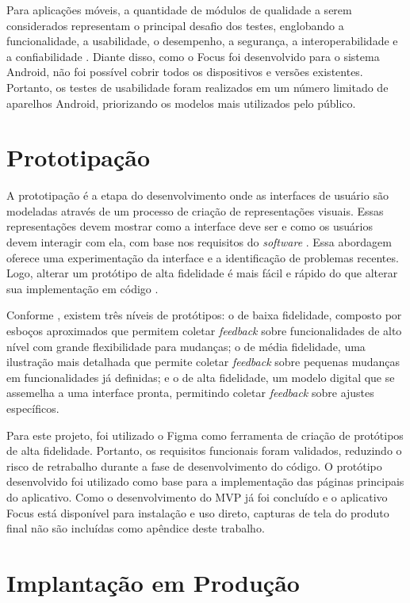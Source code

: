 Para aplicações móveis, a quantidade de módulos de qualidade a serem considerados representam o principal desafio dos testes, englobando a funcionalidade, a usabilidade, o desempenho, a segurança, a interoperabilidade e a confiabilidade \cite{goericke_2020}.
Diante disso, como o Focus foi desenvolvido para o sistema Android, não foi possível cobrir todos os dispositivos e versões existentes.
Portanto, os testes de usabilidade foram realizados em um número limitado de aparelhos Android, priorizando os modelos mais utilizados pelo público.

\section{Prototipação}

A prototipação é a etapa do desenvolvimento onde as interfaces de usuário são modeladas através de um processo de criação de representações visuais.
Essas representações devem mostrar como a interface deve ser e como os usuários devem interagir com ela, com base nos requisitos do \textit{software} \cite{letaw_2024}.
Essa abordagem oferece uma experimentação da interface e a identificação de problemas recentes.
Logo, alterar um protótipo de alta fidelidade é mais fácil e rápido do que alterar sua implementação em código \cite{letaw_2024}.

Conforme , existem três níveis de protótipos: o de baixa fidelidade, composto por esboços aproximados que permitem coletar \textit{feedback} sobre funcionalidades de alto nível com grande flexibilidade para mudanças; o de média fidelidade, uma ilustração mais detalhada que permite coletar \textit{feedback} sobre pequenas mudanças em funcionalidades já definidas; e o de alta fidelidade, um modelo digital que se assemelha a uma interface pronta, permitindo coletar \textit{feedback} sobre ajustes específicos.

Para este projeto, foi utilizado o Figma como ferramenta de criação de protótipos de alta fidelidade.
Portanto, os requisitos funcionais foram validados, reduzindo o risco de retrabalho durante a fase de desenvolvimento do código.
O protótipo desenvolvido foi utilizado como base para a implementação das páginas principais do aplicativo.
Como o desenvolvimento do MVP já foi concluído e o aplicativo Focus está disponível para instalação e uso direto, capturas de tela do produto final não são incluídas como apêndice deste trabalho.

\section{Implantação em Produção}

